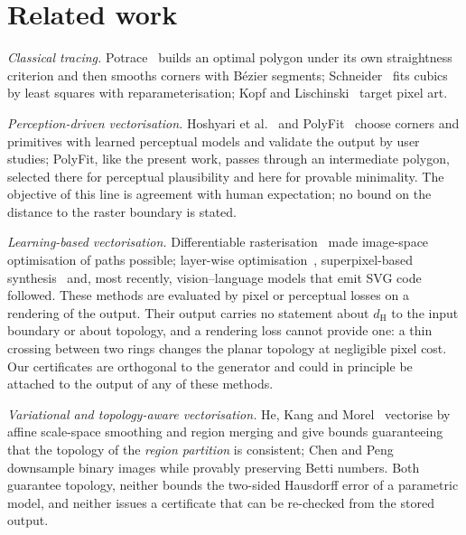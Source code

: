 \documentclass[11pt,a4paper]{article}
\theoremstyle{definition}
\theoremstyle{remark}
\newcommand{\dH}{d_{\mathrm{H}}}
\begin{document}
\section{Related work}

\emph{Classical tracing.} Potrace~\cite{selinger2003potrace} builds an optimal
polygon under its own straightness criterion and then smooths corners with
B\'ezier segments; Schneider~\cite{schneider1990fitting} fits cubics by least
squares with reparameterisation; Kopf and
Lischinski~\cite{kopf2011depixelizing} target pixel art.

\emph{Perception-driven vectorisation.} Hoshyari et al.~\cite{hoshyari2018} and
PolyFit~\cite{dominici2020} choose corners and primitives with learned
perceptual models and validate the output by user studies; PolyFit, like the
present work, passes through an intermediate polygon, selected there for
perceptual plausibility and here for provable minimality. The objective of
this line is agreement with human expectation; no bound on the distance to
the raster boundary is stated.

\emph{Learning-based vectorisation.} Differentiable
rasterisation~\cite{li2020diffvg} made image-space optimisation of paths
possible; layer-wise optimisation~\cite{ma2022}, superpixel-based
synthesis~\cite{hu2024} and, most recently, vision--language models that emit
SVG code~\cite{rodriguez2025,gehlaut2026} followed. These methods are
evaluated by pixel or perceptual losses on a rendering of the output. Their
output carries no statement about $\dH$ to the input boundary or about
topology, and a rendering loss cannot provide one: a thin crossing between two
rings changes the planar topology at negligible pixel cost. Our certificates
are orthogonal to the generator and could in principle be attached to the
output of any of these methods.

\emph{Variational and topology-aware vectorisation.} He, Kang and
Morel~\cite{he2023,he2024} vectorise by affine scale-space smoothing and
region merging and give bounds guaranteeing that the topology of the
\emph{region partition} is consistent; Chen and Peng~\cite{chen2024} downsample
binary images while provably preserving Betti numbers. Both guarantee
topology, neither bounds the two-sided Hausdorff error of a parametric model,
and neither issues a certificate that can be re-checked from the stored
output.
\end{document}
